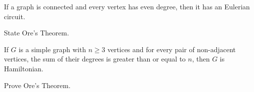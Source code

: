 \documentclass[a4paper,10pt]{exam}
\begin{document}
\begin{questions}
\begin{solution}
        If a graph is connected and every vertex has even degree, then it has an Eulerian circuit.
    \end{solution}
    \question State Ore's Theorem.
    \begin{solution}
        If $G$ is a simple graph with $n \ge 3$ vertices and for every pair of non-adjacent vertices, the sum of their degrees is greater than or equal to $n$, then $G$ is Hamiltonian.
    \end{solution}
    \question Prove Ore's Theorem.

        


    
\end{questions}
\end{document}
